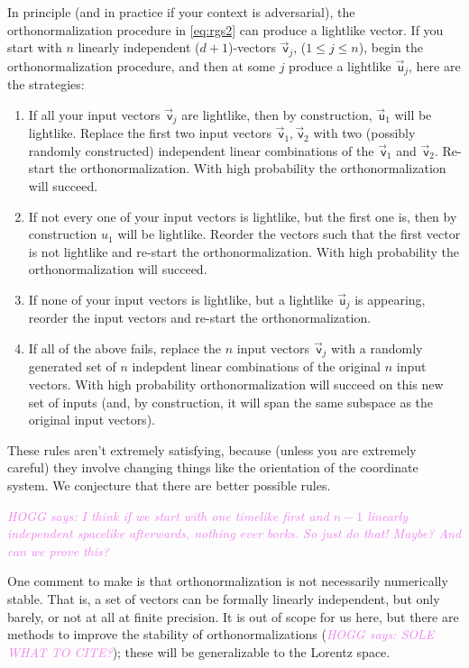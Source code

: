 \documentclass{article}
\newcommand\upvec[1]{\!\vec{\,\mathrm{#1}}}
\newcommand{\Lvec}[1]{\upvec{\mathsf{#1}}} %
\newcommand{\plus}{\!+\!} %
\newcommand{\HOGG}[1]{\textcolor{violet}{\textsl{HOGG says: {#1}}}}
\begin{document}
In principle (and in practice if your context is adversarial), the orthonormalization procedure in \eqref{eq:rgs2} can produce a lightlike vector.
If you start with $n$ linearly independent ($d\plus1$)-vectors $\Lvec{v}_j$, ($1\leq j\leq n$), begin the orthonormalization procedure, and then at some $j$ produce a lightlike $\Lvec{u}_j$, here are the strategies:
\begin{enumerate}
\item If all your input vectors $\Lvec{v}_j$ are lightlike, then by construction, $\Lvec{u}_1$ will be lightlike.
    Replace the first two input vectors $\Lvec{v}_1,\Lvec{v}_2$ with two (possibly randomly constructed) independent linear combinations of the $\Lvec{v}_1$ and $\Lvec{v}_2$.
    Re-start the orthonormalization.
    With high probability the orthonormalization will succeed.
    \item If not every one of your input vectors is lightlike, but the first one is, then by construction ${u}_1$ will be lightlike.
    Reorder the vectors such that the first vector is not lightlike and re-start the orthonormalization.
    With high probability the orthonormalization will succeed.
    \item If none of your input vectors is lightlike, but a lightlike $\Lvec{u}_j$ is appearing, reorder the input vectors and re-start the orthonormalization.
    \item If all of the above fails, replace the $n$ input vectors $\Lvec{v}_j$ with a randomly generated set of $n$ indepdent linear combinations of the original $n$ input vectors.
    With high probability orthonormalization will succeed on this new set of inputs (and, by construction, it will span the same subspace as the original input vectors).
\end{enumerate}
These rules aren't extremely satisfying, because (unless you are extremely careful) they involve changing things like the orientation of the coordinate system.
We conjecture that there are better possible rules.

\HOGG{I think if we start with one timelike first and $n-1$ linearly independent spacelike afterwards, nothing ever borks.
So just do that! Maybe? And can we prove this?}

One comment to make is that orthonormalization is not necessarily numerically stable.
That is, a set of vectors can be formally linearly independent, but only barely, or not at all at finite precision.
It is out of scope for us here, but there are methods to improve the stability of orthonormalizations (\HOGG{SOLE WHAT TO CITE?}); these will be generalizable to the Lorentz space.
\end{document}
